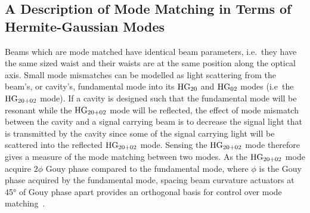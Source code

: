 \subsection{A Description of Mode Matching in Terms of Hermite-Gaussian Modes}
Beams which are mode matched have identical beam parameters, i.e.~they have the same sized waist and their waists are at the same position along the optical axis. Small mode mismatches can be modelled as light scattering from the beam's, or cavity's, fundamental mode into its $\rm{HG}_{20}$ and $\rm{HG}_{02}$ modes (i.e~the $\rm{HG}_{20+02}$ mode). If a cavity is designed such that the fundamental mode will be resonant while the $\rm{HG}_{20+02}$ mode will be reflected, the effect of mode mismatch between the cavity and a signal carrying beam is to decrease the signal light that is transmitted by the cavity since some of the signal carrying light will be scattered into the reflected $\rm{HG}_{20+02}$ mode. Sensing the $\rm{HG}_{20+02}$ mode therefore gives a measure of the mode matching between two modes. As the $\rm{HG}_{20+02}$ mode acquire $2\phi$ Gouy phase compared to the fundamental mode, where $\phi$ is the Gouy phase acquired by the fundamental mode, spacing beam curvature actuators at \ang{45} of Gouy phase apart provides an orthogonal basis for control over mode matching~\cite{Morrison1994}.


